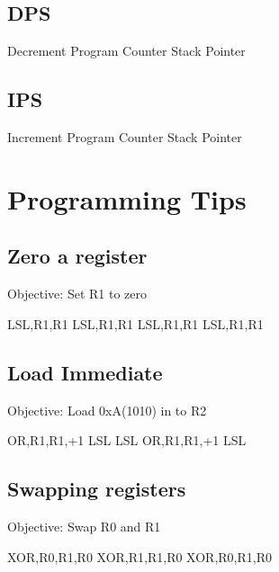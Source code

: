 \documentclass[a4paper]{article}
\begin{document}
\subsection{DPS}
Decrement Program Counter Stack Pointer

\subsection{IPS}
Increment Program Counter Stack Pointer

\section{Programming Tips}

\subsection{Zero a register}

Objective: Set R1 to zero


LSL,R1,R1
LSL,R1,R1
LSL,R1,R1
LSL,R1,R1

\subsection{Load Immediate}

Objective: Load 0xA(1010) in to R2


OR,R1,R1,+1
LSL
LSL
OR,R1,R1,+1
LSL


\subsection{Swapping registers}

Objective: Swap R0 and R1

XOR,R0,R1,R0
XOR,R1,R1,R0
XOR,R0,R1,R0
\end{document}
